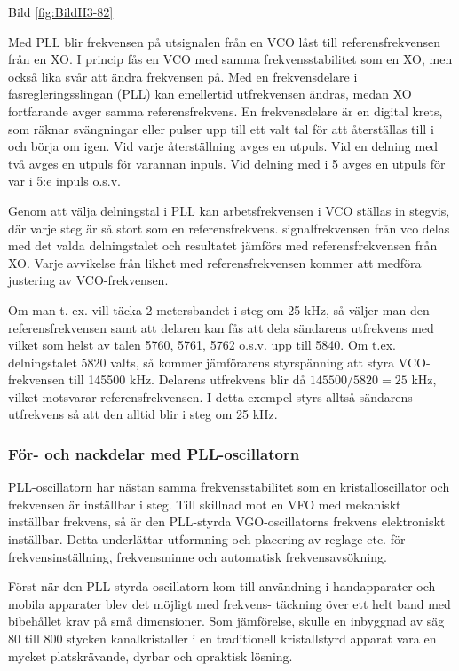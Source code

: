 Bild \ref{fig:BildII3-82}

Med PLL blir frekvensen på utsignalen från en VCO låst till
referensfrekvensen från en XO. I princip fås en VCO med samma
frekvensstabilitet som en XO, men också lika svår att ändra frekvensen
på. Med en frekvensdelare i fasregleringsslingan (PLL) kan emellertid
utfrekvensen ändras, medan XO fortfarande avger samma
referensfrekvens.  En frekvensdelare är en digital krets, som räknar
svängningar eller pulser upp till ett valt tal för att återställas
till i och börja om igen. Vid varje återställning avges en utpuls.
Vid en delning med två avges en utpuls för varannan inpuls. Vid
delning med i 5 avges en utpuls för var i 5:e inpuls o.s.v.

Genom att välja delningstal i PLL kan arbetsfrekvensen i VCO ställas
in stegvis, där varje steg är så stort som en
referensfrekvens. signalfrekvensen från vco delas med det valda
delningstalet och resultatet jämförs med referensfrekvensen från XO.
Varje avvikelse från likhet med referensfrekvensen kommer att
medföra justering av VCO-frekvensen.

Om man t. ex. vill täcka 2-metersbandet i steg om 25 kHz, så väljer
man den referensfrekvensen samt att delaren kan fås att dela sändarens
utfrekvens med vilket som helst av talen 5760, 5761, 5762 o.s.v. upp
till 5840. Om t.ex. delningstalet 5820 valts, så kommer jämförarens
styrspänning att styra VCO-frekvensen till 145500 kHz. Delarens
utfrekvens blir då \(145500/5820 = 25\) kHz, vilket motsvarar
referensfrekvensen. I detta exempel styrs alltså sändarens utfrekvens
så att den alltid blir i steg om 25 kHz.

\subsubsection{För- och nackdelar med PLL-oscillatorn}

PLL-oscillatorn har nästan samma frekvensstabilitet som en
kristalloscillator och frekvensen är inställbar i steg. Till skillnad
mot en VFO med mekaniskt inställbar frekvens, så är den PLL-styrda
VGO-oscillatorns frekvens elektroniskt inställbar. Detta underlättar
utformning och placering av reglage etc. för frekvensinställning,
frekvensminne och automatisk frekvensavsökning.

Först när den PLL-styrda oscillatorn kom till användning i
handapparater och mobila apparater blev det möjligt med frekvens-
täckning över ett helt band med bibehållet krav på små
dimensioner. Som jämförelse, skulle en inbyggnad av säg 80 till 800
stycken kanalkristaller i en traditionell kristallstyrd apparat vara
en mycket platskrävande, dyrbar och opraktisk lösning.

